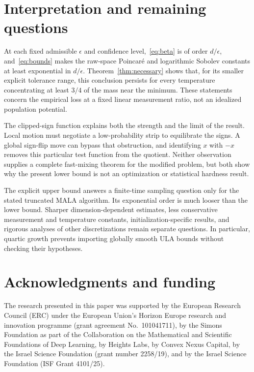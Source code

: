 \documentclass[11pt,letterpaper]{article}
\numberwithin{equation}{section}
\theoremstyle{remark}
\newcommand{\1}{\mathbf 1}
\begin{document}
\section{Interpretation and remaining questions}

At each fixed admissible $\epsilon$ and confidence level,~\eqref{eq:beta} is of order $d/\epsilon$, and~\eqref{eq:bounds} makes the raw-space Poincar\'e and logarithmic Sobolev constants at least exponential in $d/\epsilon$. Theorem~\ref{thm:necessary} shows that, for its smaller explicit tolerance range, this conclusion persists for every temperature concentrating at least $3/4$ of the mass near the minimum. These statements concern the empirical loss at a fixed linear measurement ratio, not an idealized population potential.

The clipped-sign function explains both the strength and the limit of the result. Local motion must negotiate a low-probability strip to equilibrate the signs. A global sign-flip move can bypass that obstruction, and identifying $x$ with $-x$ removes this particular test function from the quotient. Neither observation supplies a complete fast-mixing theorem for the modified problem, but both show why the present lower bound is not an optimization or statistical hardness result.

The explicit upper bound answers a finite-time sampling question only for the stated truncated MALA algorithm. Its exponential order is much looser than the lower bound. Sharper dimension-dependent estimates, less conservative measurement and temperature constants, initialization-specific results, and rigorous analyses of other discretizations remain separate questions. In particular, quartic growth prevents importing globally smooth ULA bounds without checking their hypotheses.

\section*{Acknowledgments and funding}

The research presented in this paper was supported by the European Research Council (ERC) under the European Union's Horizon Europe research and innovation programme (grant agreement No.~101041711), by the Simons Foundation as part of the Collaboration on the Mathematical and Scientific Foundations of Deep Learning, by Heights Labs, by Convex Nexus Capital, by the Israel Science Foundation (grant number 2258/19), and by the Israel Science Foundation (ISF Grant 4101/25).
\end{document}
